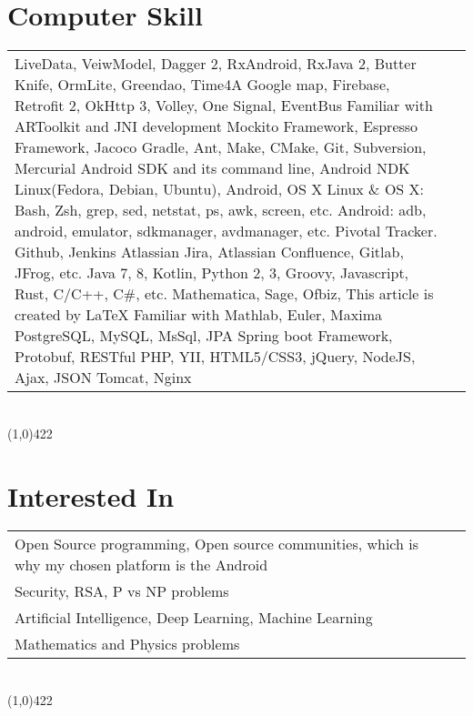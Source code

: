 \documentclass[10pt]{article}
\newcommand\HRule{\hspace*{.8cm}\line(1,0){422}\\}
\newenvironment{Record}[1]
{
    \vspace{-0.5cm}
    \section*{#1}
        \vspace{0.1cm}
        \begin{tabular}
}
{
        \end{tabular}\\
        \HRule
}
\newcommand\subsubsectionstyle{\scriptsize\texttt\subsubsectionfont}
\begin{document}
\begin{Record}{Computer Skill}{l l}
    \ComputerSkill{Android Library}
        {LiveData, VeiwModel, Dagger 2, RxAndroid, RxJava 2, Butter Knife, OrmLite, Greendao, Time4A}
        {Google map, Firebase, Retrofit 2, OkHttp 3, Volley, One Signal, EventBus}
        {Familiar with ARToolkit and JNI development}{}{}%
    \ComputerSkill{Android Test Library}
        {Mockito Framework, Espresso Framework, Jacoco}{}{}{}{}%
    \ComputerSkill{Tool}
        {Gradle, Ant, Make, CMake, Git, Subversion, Mercurial}
        {Android SDK and its command line, Android NDK}{}{}{}%
    \ComputerSkill{Operating System}
        {Linux(Fedora, Debian, Ubuntu), Android, OS X}{}{}{}{}%
    \ComputerSkill{Operating System tool}
        {Linux \& OS X: Bash, Zsh, grep, sed, netstat, ps, awk, screen, etc.}
        {Android: adb, android, emulator, sdkmanager, avdmanager, etc.}{}{}{}%
    \ComputerSkill{Development tool}
        {Pivotal Tracker. Github, Jenkins}
        {Atlassian Jira, Atlassian Confluence, Gitlab, JFrog, etc.}{}{}{}%
    \ComputerSkill{Language}
        {Java 7, 8, Kotlin, Python 2, 3, Groovy, Javascript, Rust, C/C++, C\#, etc.}
        {}{}{}{}%
    \ComputerSkill{Special Software}
        {Mathematica, Sage, Ofbiz, This article is created by \LaTeX}
        {Familiar with Mathlab, Euler, Maxima}{}{}{}%
    \ComputerSkill{Back-End Development}
        {PostgreSQL, MySQL, MsSql, JPA}
        {Spring boot Framework, Protobuf, RESTful}
        {PHP, YII, HTML5/CSS3, jQuery, NodeJS, Ajax, JSON}
        {Tomcat, Nginx}{}%
\end{Record}

\newcommand{\InterestedIn}[1]{
    \subsubsectionstyle #1\\
}
\begin{Record}{Interested In}{l l}
    \InterestedIn{Open Source programming, Open source communities, which is why my chosen platform is the Android}%
    \InterestedIn{Security, RSA, P vs NP problems}%
    \InterestedIn{Artificial Intelligence, Deep Learning, Machine Learning}%
    \InterestedIn{Mathematics and Physics problems}%
\end{Record}


\newcommand{\Education}[9]{
\subsectionfont{#1}&\subsubsectionstyle{#2}&\subsubsectionstyle{#3}&\subsubsectionstyle{#6}&\subsubsectionstyle{#7}\\
}
\end{document}
